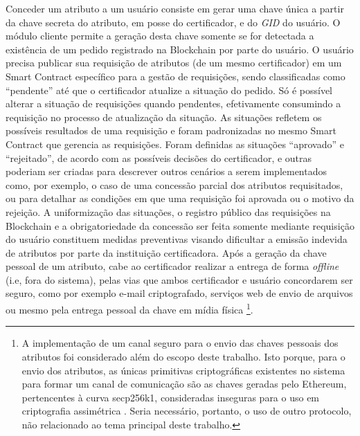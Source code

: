 \documentclass[a4paper,11pt]{article}
\begin{document}




Conceder um atributo a um usuário consiste em gerar uma chave única a partir da chave secreta do atributo, em posse do certificador, e do \emph{GID} do usuário.
O módulo cliente permite a geração desta chave somente se for detectada a existência de um pedido registrado na Blockchain por parte do usuário.
O usuário precisa publicar sua requisição de atributos (de um mesmo certificador) em um Smart Contract específico para a gestão de requisições, sendo classificadas como ``pendente'' até que o certificador atualize a situação do pedido.
Só é possível alterar a situação de requisições quando pendentes, efetivamente consumindo a requisição no processo de atualização da situação.
As situações refletem os possíveis resultados de uma requisição e foram padronizadas no mesmo Smart Contract que gerencia as requisições.
Foram definidas as situações ``aprovado'' e ``rejeitado'', de acordo com as possíveis decisões do certificador, e outras poderiam ser criadas para descrever outros cenários a serem implementados como, por exemplo, o caso de uma concessão parcial dos atributos requisitados, ou para detalhar as condições em que uma requisição foi aprovada ou o motivo da rejeição.
A uniformização das situações, o registro público das requisições na Blockchain e a obrigatoriedade da concessão ser feita somente mediante requisição do usuário constituem medidas preventivas visando dificultar a emissão indevida de atributos por parte da instituição certificadora.
Após a geração da chave pessoal de um atributo, cabe ao certificador realizar a entrega de forma \emph{offline} (i.e, fora do sistema), pelas vias que ambos certificador e usuário concordarem ser seguro, como por exemplo e-mail criptografado, serviços web de envio de arquivos ou mesmo pela entrega pessoal da chave em mídia física
\footnote{A implementação de um canal seguro para o envio das chaves pessoais dos atributos foi considerado além do escopo deste trabalho. Isto porque, para o envio dos atributos, as únicas primitivas criptográficas existentes no sistema para formar um canal de comunicação são as chaves geradas pelo Ethereum, pertencentes à curva secp256k1, consideradas inseguras para o uso em criptografia assimétrica \cite{Bernstein2017}. Seria necessário, portanto, o uso de outro protocolo, não relacionado ao tema principal deste trabalho.}.
\end{document}
